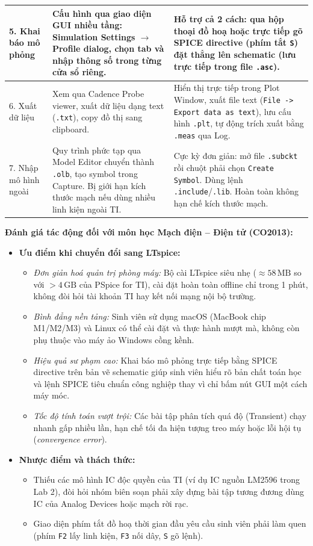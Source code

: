 \documentclass[12pt,a4paper]{article}
\begin{document}
{\begin{longtable}{|p{2.4cm}|p{6.3cm}|p{6.3cm}|}
5. Khai báo mô phỏng & Cấu hình qua giao diện GUI nhiều tầng: Simulation Settings $\rightarrow$ Profile dialog, chọn tab và nhập thông số trong từng cửa sổ riêng. & Hỗ trợ cả 2 cách: qua hộp thoại đồ hoạ hoặc trực tiếp gõ SPICE directive (phím tắt \texttt{S}) đặt thẳng lên schematic (lưu trực tiếp trong file \texttt{.asc}). \\ \hline
6. Xuất dữ liệu & Xem qua Cadence Probe viewer, xuất dữ liệu dạng text (\texttt{.txt}), copy đồ thị sang clipboard. & Hiển thị trực tiếp trong Plot Window, xuất file text (\texttt{File -> Export data as text}), lưu cấu hình \texttt{.plt}, tự động trích xuất bằng \texttt{.meas} qua Log. \\ \hline
7. Nhập mô hình ngoài & Quy trình phức tạp qua Model Editor chuyển thành \texttt{.olb}, tạo symbol trong Capture. Bị giới hạn kích thước mạch nếu dùng nhiều linh kiện ngoài TI. & Cực kỳ đơn giản: mở file \texttt{.subckt} rồi chuột phải chọn \texttt{Create Symbol}. Dùng lệnh \texttt{.include}/\texttt{.lib}. Hoàn toàn không hạn chế kích thước mạch. \\ \hline
\end{longtable}}

\textbf{Đánh giá tác động đối với môn học Mạch điện -- Điện tử (CO2013):}
\begin{itemize}
  \item \textbf{Ưu điểm khi chuyển đổi sang LTspice:}
  \begin{itemize}
    \item \textit{Đơn giản hoá quản trị phòng máy:} Bộ cài LTspice siêu nhẹ ($\approx 58\,\text{MB}$ so với $>4\,\text{GB}$ của PSpice for TI), cài đặt hoàn toàn offline chỉ trong 1 phút, không đòi hỏi tài khoản TI hay kết nối mạng nội bộ trường.
    \item \textit{Bình đẳng nền tảng:} Sinh viên sử dụng macOS (MacBook chip M1/M2/M3) và Linux có thể cài đặt và thực hành mượt mà, không còn phụ thuộc vào máy ảo Windows cồng kềnh.
    \item \textit{Hiệu quả sư phạm cao:} Khai báo mô phỏng trực tiếp bằng SPICE directive trên bản vẽ schematic giúp sinh viên hiểu rõ bản chất toán học và lệnh SPICE tiêu chuẩn công nghiệp thay vì chỉ bấm nút GUI một cách máy móc.
    \item \textit{Tốc độ tính toán vượt trội:} Các bài tập phân tích quá độ (Transient) chạy nhanh gấp nhiều lần, hạn chế tối đa hiện tượng treo máy hoặc lỗi hội tụ (\textit{convergence error}).
  \end{itemize}
  \item \textbf{Nhược điểm và thách thức:}
  \begin{itemize}
    \item Thiếu các mô hình IC độc quyền của TI (ví dụ IC nguồn LM2596 trong Lab 2), đòi hỏi nhóm biên soạn phải xây dựng bài tập tương đương dùng IC của Analog Devices hoặc mạch rời rạc.
    \item Giao diện phím tắt đồ hoạ thời gian đầu yêu cầu sinh viên phải làm quen (phím \texttt{F2} lấy linh kiện, \texttt{F3} nối dây, \texttt{S} gõ lệnh).
  \end{itemize}
\end{itemize}
\end{document}
